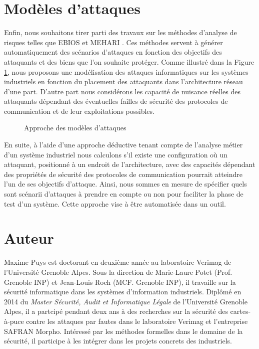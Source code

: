 \documentclass{article}
\begin{document}
\section{Modèles d'attaques}\label{sec:models}

Enfin, nous souhaitons tirer parti des travaux sur les méthodes d'analyse
de risques telles que EBIOS \cite{EBIOS} et MEHARI \cite{MEHARI}.
Ces méthodes servent à générer automatiquement des scénarios d'attaques en
fonction des objectifs des attaquants et des biens que l'on souhaite protéger.
Comme illustré dans la Figure \ref{fig:models}, nous proposons une modélisation
des attaques informatiques sur les systèmes industriels en fonction du placement
des attaquants dans l'architecture réseau d'une part.
D'autre part nous considérons les capacité de nuisance réelles des attaquants
dépendant des éventuelles failles de sécurité des protocoles de communication et
de leur exploitations possibles.

\begin{figure}[htb]
    \centering
    \resizebox{.6\textwidth}{!}{
        
    }
    \caption{Approche des modèles d'attaques}
    \label{fig:models}
\end{figure}

En suite, à l'aide d'une approche déductive tenant compte de l’analyse métier
d’un système industriel nous calculons s'il existe une configuration où un
attaquant, positionné à un endroit de l'architecture, avec des capacités
dépendant des propriétés de sécurité des protocoles de communication pourrait
atteindre l'un de ses objectifs d'attaque.
Ainsi, nous sommes en mesure de spécifier quels sont scénarii d’attaques à
prendre en compte ou non pour faciliter la phase de test d'un système.
Cette approche vise à être automatisée dans un outil.

\section{Auteur}

Maxime Puys est doctorant en deuxième année au laboratoire Verimag de
l'Université Grenoble Alpes.
Sous la direction de Marie-Laure Potet (Prof. Grenoble INP) et Jean-Louis Roch
(MCF. Grenoble INP), il travaille sur la sécurité informatique dans les
systèmes d'information industriels.
Diplômé en 2014 du {\em Master Sécurité, Audit et Informatique Légale} de
l'Université Grenoble Alpes, il a partcipé pendant deux ans à des recherches sur
la sécurité des cartes-à-puce contre les attaques par fautes dans le laboratoire
Verimag et l'entreprise SAFRAN Morpho.
Intéressé par les méthodes formelles dans le domaine de la sécurité, il
participe à les intégrer dans les projets concrets des industriels.



\end{document}
